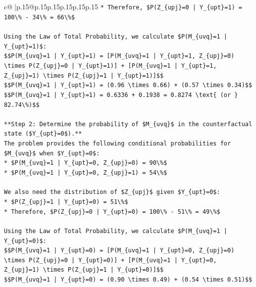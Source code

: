 \documentclass{article}
\begin{document}
{\begin{supertabular}{c@{$\;$}|p{.15\linewidth}@{}p{.15\linewidth}p{.15\linewidth}p{.15\linewidth}p{.15\linewidth}p{.15\linewidth}}
{{{\texttt{*   Therefore, \$P(Z\_\{upj\}=0 | Y\_\{upt\}=1) = 100\textbackslash{}\% {-} 34\textbackslash{}\% = 66\textbackslash{}\%\$} \\
\\ 
\texttt{Using the Law of Total Probability, we calculate \$P(M\_\{uvq\}=1 | Y\_\{upt\}=1)\$:} \\
\texttt{\$\$P(M\_\{uvq\}=1 | Y\_\{upt\}=1) = {[}P(M\_\{uvq\}=1 | Y\_\{upt\}=1, Z\_\{upj\}=0) \textbackslash{}times P(Z\_\{upj\}=0 | Y\_\{upt\}=1){]} + {[}P(M\_\{uvq\}=1 | Y\_\{upt\}=1, Z\_\{upj\}=1) \textbackslash{}times P(Z\_\{upj\}=1 | Y\_\{upt\}=1){]}\$\$} \\
\texttt{\$\$P(M\_\{uvq\}=1 | Y\_\{upt\}=1) = (0.96 \textbackslash{}times 0.66) + (0.57 \textbackslash{}times 0.34)\$\$} \\
\texttt{\$\$P(M\_\{uvq\}=1 | Y\_\{upt\}=1) = 0.6336 + 0.1938 = 0.8274 \textbackslash{}text\{ (or \} 82.74\textbackslash{}\%)\$\$} \\
\\ 
\texttt{**Step 2: Determine the probability of \$M\_\{uvq\}\$ in the counterfactual state (\$Y\_\{upt\}=0\$).**} \\
\texttt{The problem provides the following conditional probabilities for \$M\_\{uvq\}\$ when \$Y\_\{upt\}=0\$:} \\
\texttt{*   \$P(M\_\{uvq\}=1 | Y\_\{upt\}=0, Z\_\{upj\}=0) = 90\textbackslash{}\%\$} \\
\texttt{*   \$P(M\_\{uvq\}=1 | Y\_\{upt\}=0, Z\_\{upj\}=1) = 54\textbackslash{}\%\$} \\
\\ 
\texttt{We also need the distribution of \$Z\_\{upj\}\$ given \$Y\_\{upt\}=0\$:} \\
\texttt{*   \$P(Z\_\{upj\}=1 | Y\_\{upt\}=0) = 51\textbackslash{}\%\$} \\
\texttt{*   Therefore, \$P(Z\_\{upj\}=0 | Y\_\{upt\}=0) = 100\textbackslash{}\% {-} 51\textbackslash{}\% = 49\textbackslash{}\%\$} \\
\\ 
\texttt{Using the Law of Total Probability, we calculate \$P(M\_\{uvq\}=1 | Y\_\{upt\}=0)\$:} \\
\texttt{\$\$P(M\_\{uvq\}=1 | Y\_\{upt\}=0) = {[}P(M\_\{uvq\}=1 | Y\_\{upt\}=0, Z\_\{upj\}=0) \textbackslash{}times P(Z\_\{upj\}=0 | Y\_\{upt\}=0){]} + {[}P(M\_\{uvq\}=1 | Y\_\{upt\}=0, Z\_\{upj\}=1) \textbackslash{}times P(Z\_\{upj\}=1 | Y\_\{upt\}=0){]}\$\$} \\
\texttt{\$\$P(M\_\{uvq\}=1 | Y\_\{upt\}=0) = (0.90 \textbackslash{}times 0.49) + (0.54 \textbackslash{}times 0.51)\$\$} \\
}}}
\end{supertabular}}
\end{document}
